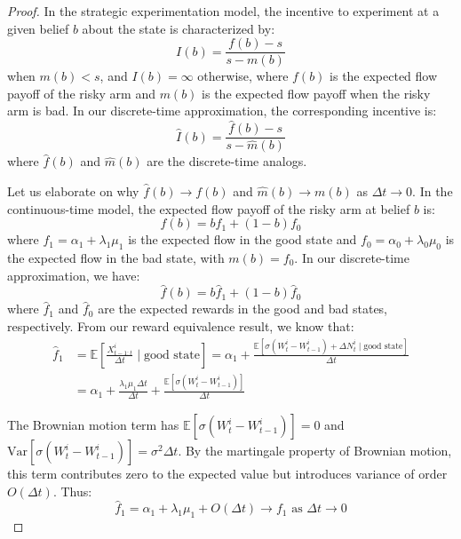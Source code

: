     \begin{proof}
        In the strategic experimentation model, the incentive to experiment at a given belief $b$ about the state is characterized by:
        \begin{equation}
            I(b) = \frac{f(b) - s}{s - m(b)}
        \end{equation}
        when $m(b) < s$, and $I(b) = \infty$ otherwise, where $f(b)$ is the expected flow payoff of the risky arm and $m(b)$ is the expected flow payoff when the risky arm is bad. In our discrete-time approximation, the corresponding incentive is:
        \begin{equation}
            \hat{I}(b) = \frac{\hat{f}(b) - s}{s - \hat{m}(b)}
        \end{equation}
        where $\hat{f}(b)$ and $\hat{m}(b)$ are the discrete-time analogs.

        Let us elaborate on why $\hat{f}(b) \to f(b)$ and $\hat{m}(b) \to m(b)$ as $\Delta t \to 0$. In the continuous-time model, the expected flow payoff of the risky arm at belief $b$ is:
        \begin{equation}
            f(b) = b f_1 + (1-b) f_0
        \end{equation}
        where $f_1 = \alpha_1 + \lambda_1\mu_1$ is the expected flow in the good state and $f_0 = \alpha_0 + \lambda_0\mu_0$ is the expected flow in the bad state, with $m(b) = f_0$. In our discrete-time approximation, we have:
        \begin{equation}
            \hat{f}(b) = b \hat{f}_1 + (1-b) \hat{f}_0
        \end{equation}
        where $\hat{f}_1$ and $\hat{f}_0$ are the expected rewards in the good and bad states, respectively.
        From our reward equivalence result, we know that:
        \begin{align}
            \hat{f}_1 & = \mathbb{E}\left[\frac{X^i_{t-1:t}}{\Delta t} \mid \text{good state}\right] = \alpha_1 + \frac{\mathbb{E}[\sigma(W^i_t - W^i_{t-1}) + \Delta N^i_t \mid \text{good state}]}{\Delta t} \\
                      & = \alpha_1 + \frac{\lambda_1\mu_1\Delta t}{\Delta t} + \frac{\mathbb{E}[\sigma(W^i_t - W^i_{t-1})]}{\Delta t}
        \end{align}

        The Brownian motion term has $\mathbb{E}[\sigma(W^i_t - W^i_{t-1})] = 0$ and $\text{Var}[\sigma(W^i_t - W^i_{t-1})] = \sigma^2 \Delta t$. By the martingale property of Brownian motion, this term contributes zero to the expected value but introduces variance of order $O(\Delta t)$. Thus:
        \begin{equation}
            \hat{f}_1 = \alpha_1 + \lambda_1\mu_1 + O(\Delta t) \to f_1 \text{ as } \Delta t \to 0
        \end{equation}


\end{proof}
